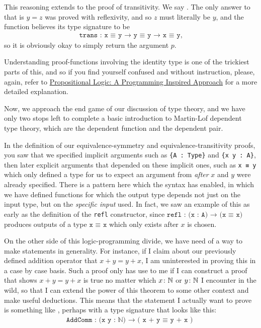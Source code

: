 \documentclass[11pt]{article}
\begin{document}
This reasoning extends to the proof of transitivity. We say . The only answer to that is $y = z$ was proved with reflexivity, and so $z$ must literally be $y$, and the function believes its type signature to be \begin{gather*}
\texttt{trans : x ≡ y → y ≡ y → x ≡ y},
\end{gather*}
so it is obviously okay to simply return the argument $p$.

Understanding proof-functions involving the identity type is one of the trickiest parts of this, and so if you find yourself confused and without instruction, please, again, refer to \hyperlink{https://clockssugars.blog/appliuni/prelims/proptypes.html}{Propositional Logic: A Programming Inspired Approach} for a more detailed explanation.

Now, we approach the end game of our discussion of type theory, and we have only two stops left to complete a basic introduction to Martin-Lof dependent type theory, which are the dependent function and the dependent pair.

In the definition of our equivalence-symmetry and equivalence-transitivity proofs, you saw that we specified implicit arguments such as \texttt{\{A : Type\}} and \texttt{\{x y : A\}}, then later explicit arguments that depended on these implicit ones, such as \texttt{x ≡ y} which only defined a type for us to expect an argument from \emph{after} $x$ and $y$ were already specified. There is a pattern here which the syntax has enabled, in which we have defined functions for which the output type depends not just on the input type, but on the \emph{specific input} used. In fact, we saw an example of this as early as the definition of the \texttt{refl} constructor, since $\texttt{refl : (x : A) → (x ≡ x) }$ produces outputs of a type $\texttt{x ≡ x}$ which only exists after $x$ is chosen.

On the other side of this logic-programming divide, we have need of a way to make statements in generality. For instance, if I claim about our previously defined addition operator that $x + y = y + x$, I am uninterested in proving this in a case by case basis. Such a proof only has use to me if I can construct a proof that shows $x + y = y + x$ is true no matter which $x \colon \mathbb{N}$ or $y \colon \mathbb{N}$ I encounter in the wild, so that I can extend the power of this theorem to some other context and make useful deductions. This means that the statement I actually want to prove is something like , perhaps with a type signature that looks like this: \begin{gather*}
\texttt{AddComm : (x y : ℕ) → ( x + y ≡ y + x ) }
\end{gather*}
\end{document}
